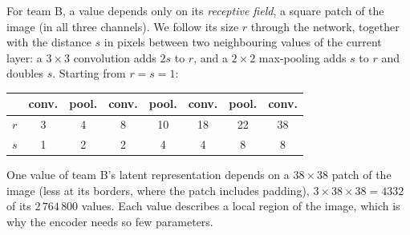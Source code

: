 \documentclass[11pt, a4paper]{exam}
\begin{document}
\begin{exercises}
\begin{parts}
\begin{solution}
        For team B, a value depends only on its \emph{receptive field}, a square patch of the image (in all three channels). We follow its size $r$ through the network, together with the distance $s$ in pixels between two neighbouring values of the current layer: a $3 \times 3$ convolution adds $2s$ to $r$, and a $2 \times 2$ max-pooling adds $s$ to $r$ and doubles $s$. Starting from $r = s = 1$:
        \begin{center}
            \begin{tabular}{lccccccc}
                \toprule
                & conv. & pool. & conv. & pool. & conv. & pool. & conv. \\
                \midrule
                $r$ & 3 & 4 & 8 & 10 & 18 & 22 & 38 \\
                $s$ & 1 & 2 & 2 & 4 & 4 & 8 & 8 \\
                \bottomrule
            \end{tabular}
        \end{center}
        One value of team B's latent representation depends on a $38 \times 38$ patch of the image (less at its borders, where the patch includes padding), $3 \times 38 \times 38 = 4332$ of its $2\,764\,800$ values. Each value describes a local region of the image, which is why the encoder needs so few parameters.
    \end{solution}
\end{parts}

\end{exercises}
\end{document}
